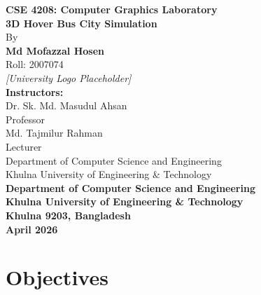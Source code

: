 \documentclass[12pt,a4paper]{article}
\begin{document}
\begin{titlepage}
    \centering
    \vspace*{1cm}

    {\LARGE \textbf{CSE 4208: Computer Graphics Laboratory}}\\[0.5cm]
    {\LARGE \textbf{3D Hover Bus City Simulation}}\\[1.5cm]

    By\\[0.3cm]
    {\Large \textbf{Md Mofazzal Hosen}}\\
    Roll: 2007074\\[2cm]

    \textit{[University Logo Placeholder]}\\[1.5cm]

    \textbf{Instructors:}\\
    Dr. Sk. Md. Masudul Ahsan\\
    Professor\\[0.3cm]
    Md. Tajmilur Rahman\\
    Lecturer\\[1.5cm]

    Department of Computer Science and Engineering\\
    Khulna University of Engineering \& Technology\\[1cm]

    \textbf{Department of Computer Science and Engineering}\\
    \textbf{Khulna University of Engineering \& Technology}\\
    \textbf{Khulna 9203, Bangladesh}\\
    \textbf{April 2026}

\end{titlepage}

\newpage
\tableofcontents
\newpage

\section{Objectives}
\end{document}

